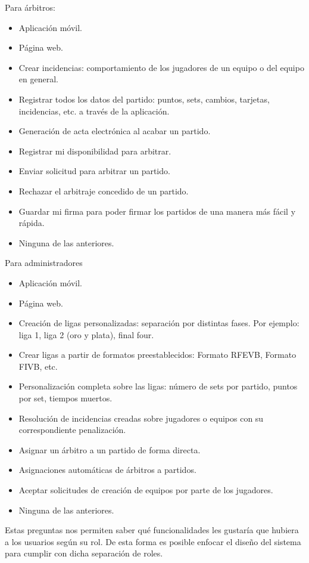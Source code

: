Para árbitros:
\begin{itemize}
    \item Aplicación móvil.
    \item Página web.
    \item Crear incidencias: comportamiento de los jugadores de un equipo o del equipo en general.
    \item Registrar todos los datos del partido: puntos, sets, cambios, tarjetas, incidencias, etc. a través de la aplicación.
    \item Generación de acta electrónica al acabar un partido.
    \item Registrar mi disponibilidad para arbitrar.
    \item Enviar solicitud para arbitrar un partido.
    \item Rechazar el arbitraje concedido de un partido.
    \item Guardar mi firma para poder firmar los partidos de una manera más fácil y rápida.
    \item Ninguna de las anteriores.
\end{itemize}

Para administradores
\begin{itemize}
    \item Aplicación móvil.
    \item Página web.
    \item Creación de ligas personalizadas: separación por distintas fases. Por ejemplo: liga 1, liga 2 (oro y plata), final four.
    \item Crear ligas a partir de formatos preestablecidos: Formato \ac{RFEVB}, Formato \ac{FIVB}, etc.
    \item Personalización completa sobre las ligas: número de sets por partido, puntos por set, tiempos muertos.
    \item Resolución de incidencias creadas sobre jugadores o equipos con su correspondiente penalización.
    \item Asignar un árbitro a un partido de forma directa.
    \item Asignaciones automáticas de árbitros a partidos.
    \item Aceptar solicitudes de creación de equipos por parte de los jugadores.
    \item Ninguna de las anteriores.
\end{itemize}

Estas preguntas nos permiten saber qué funcionalidades les gustaría que hubiera a los usuarios según su rol. De esta forma es posible enfocar el diseño del sistema para cumplir con dicha separación de roles.

